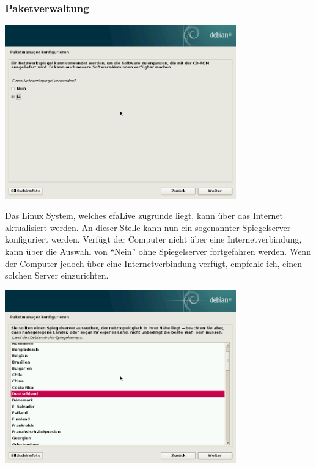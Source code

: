 \documentclass[a4paper,12pt,twoside]{article}
\begin{document}
\subsubsection{Paketverwaltung}
\label{sct:paketverwaltung}

\begin{minipage}{\linewidth}
    \centering
    \captionsetup{type=figure}
    \includegraphics[width=10cm]{screenshots/use_mirror.png}
    \label{fig:abfrage_mirror}
\end{minipage}
\bigskip

Das Linux System, welches efaLive zugrunde liegt, kann über das Internet
aktualisiert werden. An dieser Stelle kann nun ein sogenannter
Spiegelserver konfiguriert werden. Verfügt der Computer nicht über eine
Internetverbindung, kann über die Auswahl von
"`Nein"' ohne Spiegelserver fortgefahren
werden. Wenn der Computer jedoch über eine Internetverbindung verfügt,
empfehle ich, einen solchen Server einzurichten.

\begin{minipage}{\linewidth}
    \centering
    \captionsetup{type=figure}
    \includegraphics[width=10cm]{screenshots/select_mirror_country.png}
    \label{fig:mirror_region}
\end{minipage}
\end{document}
